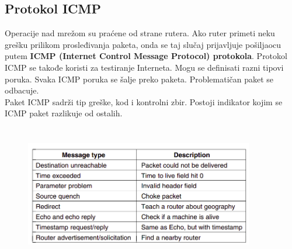 \documentclass[a4paper]{article}
\begin{document}
    \subsection{Protokol ICMP}
        Operacije nad mrežom su praćene od strane rutera. Ako ruter primeti neku grešku prilikom
        prosleđivanja paketa, onda se taj slučaj prijavljuje pošiljaocu putem \textbf{ICMP (Internet 
        Control Message Protocol) protokola}. Protokol ICMP se takođe koristi za testiranje Interneta. 
        Mogu se definisati razni tipovi poruka. Svaka ICMP poruka se šalje preko paketa. Problematičan
        paket se odbacuje. \\
        \indent Paket ICMP sadrži tip greške, kod i kontrolni zbir. Postoji indikator kojim
        se ICMP paket razlikuje od ostalih.  
        \begin{figure}[H]
            \begin{center}
                \includegraphics[width=100mm,height=60mm]{Slike/icmp_tipovi.png}
            \end{center}
        \end{figure}

    \newpage
\end{document}
